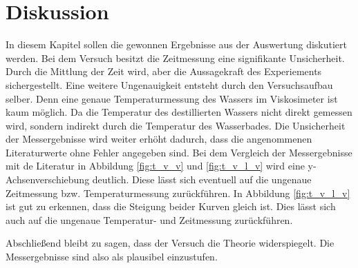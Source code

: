 \section{Diskussion}
In diesem Kapitel sollen die gewonnen Ergebnisse
aus der Auswertung diskutiert werden.
Bei dem Versuch besitzt die Zeitmessung eine
signifikante Unsicherheit.
Durch die Mittlung der Zeit wird, aber die Aussagekraft des
Experiements sichergestellt.
Eine weitere Ungenauigkeit entsteht durch den Versuchsaufbau selber.
Denn eine genaue Temperaturmessung des Wassers im Viskosimeter 
ist kaum möglich.
Da die Temperatur des destillierten Wassers nicht direkt gemessen wird, 
sondern indirekt durch die Temperatur des Wasserbades.
Die Unsicherheit der Messergebnisse wird weiter erhöht dadurch, dass
die angenommenen Literaturwerte ohne Fehler angegeben sind.
Bei dem Vergleich der Messergebnisse mit de Literatur in Abbildung 
\ref{fig:t_v_v} und \ref{fig:t_v_l_v} wird eine y-Achsenverschiebung deutlich.
Diese lässt sich eventuell auf die ungenaue Zeitmessung bzw. Temperaturmessung zurückführen.
In Abbildung \ref{fig:t_v_l_v} ist gut zu erkennen, dass die Steigung beider 
Kurven gleich ist.
Dies lässt sich auch auf die ungenaue Temperatur- und Zeitmessung zurückführen.%

Abschließend bleibt zu sagen, dass der Versuch die Theorie widerspiegelt.
Die Messergebnisse sind also als plausibel einzustufen.